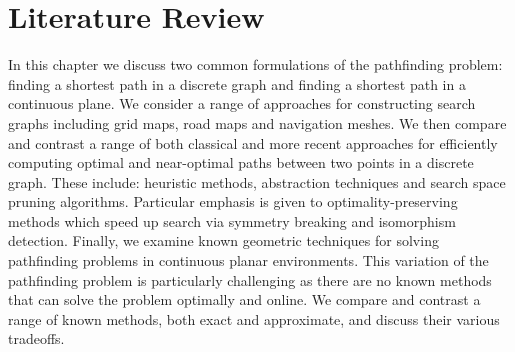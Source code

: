 \chapter{Literature Review}
\label{cha::lit::abstract}
In this chapter we discuss two common formulations of the pathfinding problem: 
finding a shortest path in a discrete graph and finding a shortest path in a 
continuous plane.
We consider a range of approaches for constructing search graphs including grid
maps, road maps and navigation meshes.  We then compare and contrast a range of
both classical and more recent approaches for efficiently computing optimal and
near-optimal paths between two points in a discrete graph.  These include:
heuristic methods, abstraction techniques and search space pruning algorithms.
Particular emphasis is given to optimality-preserving methods which speed up
search via symmetry breaking and isomorphism detection.
Finally, we examine known geometric techniques for solving pathfinding problems
in continuous planar environments.  This variation of the pathfinding problem is
particularly challenging as there are no known methods that can solve the
problem optimally and online.  We compare and contrast a range of known methods, 
both exact and approximate, and discuss their various tradeoffs.


